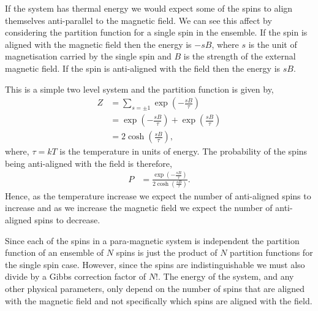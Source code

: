 \documentclass[a4paper, twocolumn]{article}
\begin{document}
If the system has thermal energy we would expect some of the %
spins to align themselves anti-parallel to the magnetic field. %
We can see this affect by considering the partition function %
for a single spin in the ensemble. If the spin is aligned with %
the magnetic field then the energy is \(-sB\), where \(s\) is %
the unit of magnetisation carried by the single spin and \(B\) %
is the strength of the external magnetic field. If the spin is %
anti-aligned with the field then the energy is \(sB\). 


This is a simple two level system and the partition function %
is given by, 
%
\begin{align}
    Z &= \sum_{s = \pm 1}\exp\left(-\frac{sB}{\tau}\right)\nonumber\\
        &= \exp\left(-\frac{sB}{\tau}\right) + 
            \exp\left(\frac{sB}{\tau}\right)\nonumber\\
        &= 2\cosh\left(\frac{sB}{\tau}\right),
    \label{eqn:18}
\end{align}
%
where, \(\tau = kT\) is the temperature in units of energy. %
The probability of the spins being anti-aligned with the %
field is therefore, 
%
\begin{align}
    P &= \frac{\exp\left(-\frac{sB}{\tau}\right)}
            {2\cosh\left(\frac{sB}{\tau}\right)}.
    \label{eqn:9}
\end{align}
%
Hence, as the temperature increase we expect the number of %
anti-aligned spins to increase and as we increase the %
magnetic field we expect the number of anti-aligned spins %
to decrease. 


Since each of the spins in a para-magnetic system is independent %
the partition function of an ensemble of \(N\) spins is just %
the product of \(N\) partition functions for the single spin %
case. However, since the spins are indistinguishable we must %
also divide by a Gibbs correction factor of \(N!\). %
The energy of the system, and any other physical %
parameters, only depend on the number of spins that are %
aligned with the magnetic field and not specifically %
which spins are aligned with the field. 
\end{document}

